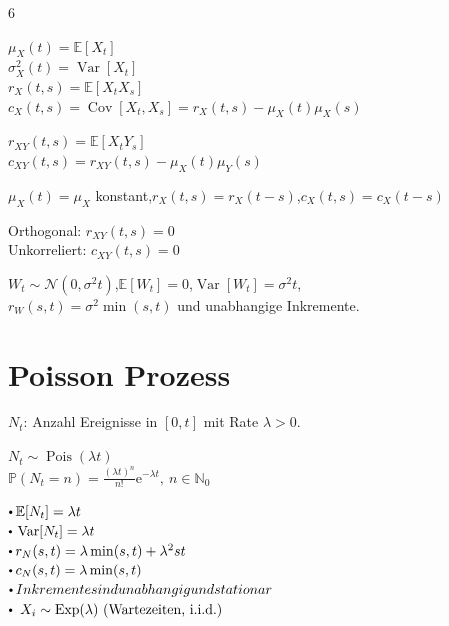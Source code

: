 \documentclass[8pt,a4paper,landscape]{extarticle}
\begin{document}
\begin{multicols*}{6}

$\mu_X(t)=\mathbb{E}[X_t]$ \\
$\sigma_X^2(t)=\operatorname{Var}[X_t]$ \\
$r_X(t,s)=\mathbb{E}[X_tX_s]$ \\
$c_X(t,s)=\operatorname{Cov}[X_t,X_s]=r_X(t,s)-\mu_X(t)\mu_X(s)$


$r_{XY}(t,s)=\mathbb{E}[X_tY_s]$ \\
$c_{XY}(t,s)=r_{XY}(t,s)-\mu_X(t)\mu_Y(s)$


$\mu_X(t)=\mu_X$ konstant,\quad $r_X(t,s)=r_X(t-s)$,\quad $c_X(t,s)=c_X(t-s)$


Orthogonal: $r_{XY}(t,s)=0$ \\
Unkorreliert: $c_{XY}(t,s)=0$


$W_t\sim\mathcal{N}(0,\sigma^2 t)$,\quad $\mathbb{E}[W_t]=0$,\quad $\operatorname{Var}[W_t]=\sigma^2 t$, \\
$r_W(s,t)=\sigma^2\min(s,t)$ und unabhangige Inkremente.


\section{Poisson Prozess}


$N_t$: Anzahl Ereignisse in $[0,t]$ mit Rate $\lambda>0$.

$N_t\sim\operatorname{Pois}(\lambda t)$ \\
$\mathbb{P}(N_t=n)=\frac{(\lambda t)^n}{n!}\mathrm{e}^{-\lambda t},\ n\in\mathbb{N}_0$

\CheatsheetItemListStart
\CheatsheetItemListEnd
$\sbullet \mathbb{E}[N_t]=\lambda t$ \\
$\sbullet \operatorname{Var}[N_t]=\lambda t$ \\
$\sbullet r_N(s,t)=\lambda\min(s,t)+\lambda^2st$ \\
$\sbullet c_N(s,t)=\lambda\min(s,t)$ \\
$\sbullet Inkremente sind unabhangig und stationar$ \\
$\sbullet\ X_i\sim\operatorname{Exp}(\lambda)\ \text{(Wartezeiten, i.i.d.)}$



\end{multicols*}
\end{document}
